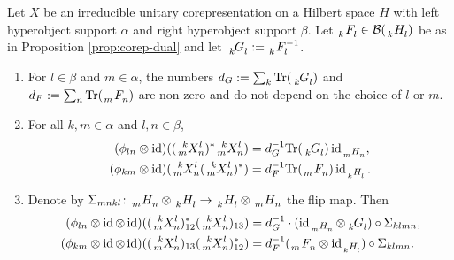\begin{Theorem} \label{thm:schur}
  Let $X$ be an irreducible unitary corepresentation on a Hilbert space $H$ with left hyperobject
  support  $\alpha$ and right hyperobject support $\beta$. Let $\Grd{F}{k}{l}
  \in \mathcal{B}(\Grd{H}{k}{l})$ be as in Proposition \ref{prop:corep-dual} and let
  $\Grd{G}{k}{l}:=\Gr{F}{}{-1}{k}{l}$.
  \begin{enumerate}
  \item For $l \in \beta$ and $m\in\alpha$, the numbers $d_G:=\sum_{k} \Tr (\Grd{G}{k}{l})$ and $d_F:=\sum_{n} \Tr (\Grd{F}{m}{n})$ are non-zero and do not depend on the choice of $l$ or $m$.
    \item  For all $k,m \in \alpha$ and $l,n\in \beta$,
    \begin{align*}
      (\phi_{ln} \otimes \id)((\Gr{X}{k}{l}{m}{n})^{*}\Gr{X}{k}{l}{m}{n})
      &=d_G^{-1}\Tr(\Gru{G}{k}{l})
      \id_{\Grd{H}{m}{n}}, \\
      (\phi_{km} \otimes \id)(\Gr{X}{k}{l}{m}{n}(\Gr{X}{k}{l}{m}{n})^{*})
      &=d_F^{-1}\Tr(\Grd{F}{m}{n})
      \id_{\Grd{H}{k}{l}}.
    \end{align*}
  \item    Denote by $\Sigma_{mnkl} \colon \Grd{H}{m}{n}\otimes \Grd{H}{k}{l} \to \Grd{H}{k}{l}\otimes
  \Grd{H}{m}{n}$ the flip map. Then
    \begin{align*}
      (\phi_{ln} \otimes \id \otimes
    \id)((\Gr{X}{k}{l}{m}{n})^{*}_{12}(\Gr{X}{k}{l}{m}{n})_{13})  &=  d_{G}^{-1}\cdot
    (\id_{\Grd{H}{m}{n}} \otimes \Grd{G}{k}{l}) \circ \Sigma_{klmn}, \\
   (\phi_{km} \otimes \id \otimes
   \id)((\Gr{X}{k}{l}{m}{n})_{13}(\Gr{X}{k}{l}{m}{n})^{*}_{12}) &= d_F^{-1} (\Grd{F}{m}{n}
   \otimes \id_{\Grd{H}{k}{l}}) \circ \Sigma_{klmn}.
    \end{align*}
  \end{enumerate}
\end{Theorem}

